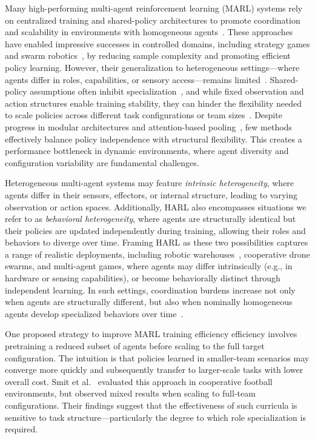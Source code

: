 Many high-performing multi-agent reinforcement learning (MARL) systems rely on 
centralized training and shared-policy architectures to promote coordination and scalability 
in environments with homogeneous agents~\cite{ackermann2019,zhou2023}.
These approaches have enabled impressive successes in controlled domains, 
including strategy games and swarm robotics~\cite{vinyals2019, hoang2023}, 
by reducing sample complexity and promoting efficient policy learning. However, their 
generalization to heterogeneous settings—where agents differ in roles, capabilities, or 
sensory access—remains limited~\cite{zhong2024}. 
Shared-policy assumptions often inhibit specialization~\cite{smit2023}, 
and while fixed observation and action structures enable training stability, 
they can hinder the flexibility needed to scale policies across different 
task configurations or team sizes~\cite{papoudakis2021}. Despite progress 
in modular architectures and attention-based pooling~\cite{iqbal2021, foerster2017}, 
few methods effectively balance policy independence with structural flexibility. 
This creates a performance bottleneck in dynamic environments, where agent diversity and 
configuration variability are fundamental challenges.

Heterogeneous multi-agent systems may feature \emph{intrinsic heterogeneity}, 
where agents differ in their sensors, effectors, or internal structure, 
leading to varying observation or action spaces. Additionally, 
HARL also encompasses situations we refer to as \emph{behavioral heterogeneity}, 
where agents are structurally identical but their policies are updated independently 
during training, allowing their roles and behaviors to diverge over time. 
Framing HARL as these two possibilities captures a range of realistic deployments, including 
robotic warehouses~\cite{rizk2019}, cooperative drone swarms, and multi-agent games, where 
agents may differ intrinsically (e.g., in hardware or sensing capabilities), 
or become behaviorally distinct through independent learning. In such settings, 
coordination burdens increase not only when agents are structurally different, 
but also when nominally homogeneous agents develop specialized behaviors over 
time~\cite{shoham2007,ackermann2019}.

One proposed strategy to improve MARL training efficiency efficiency involves pretraining 
a reduced subset of agents before scaling to the full target configuration. 
The intuition is that policies learned in smaller-team scenarios may converge 
more quickly and subsequently transfer to larger-scale tasks with lower overall cost. 
Smit et al.~\cite{smit2023} evaluated this approach in cooperative football environments, 
but observed mixed results when scaling to full-team configurations. Their findings 
suggest that the effectiveness of such curricula is sensitive to task structure—particularly 
the degree to which role specialization is required.


